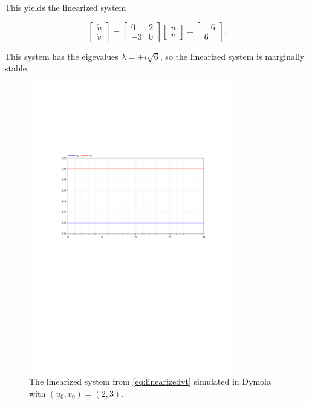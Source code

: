 \documentclass{article}
\begin{document}
This yields the linearized system

\begin{equation}\label{eq:linearizedvt}
    \begin{bmatrix}
        \dot u\\ \dot v
    \end{bmatrix} = 
    \begin{bmatrix}
        0 & 2 \\ -3 & 0
    \end{bmatrix}
    \begin{bmatrix}
        u\\ v
    \end{bmatrix} +
    \begin{bmatrix}
        -6\\6
    \end{bmatrix}.
\end{equation}

This system has the eigevalues $\lambda = \pm i\sqrt {6}$, so the linearized system is marginally stable.

\begin{figure}[H]
    \centering
    \includegraphics[width = 0.8\textwidth]{ex6_1c_23}
    \caption{The linearized system from \ref{eq:linearizedvt} simulated in Dymola with $(u_0,v_0) = (2,3)$.}
    \label{fig:1c_23}
\end{figure}
\end{document}
